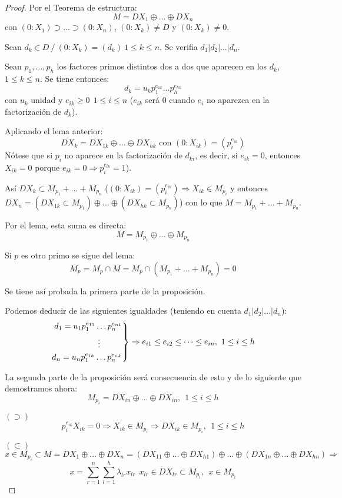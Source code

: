 \documentclass{article}
\newenvironment{rcases}
{\left.\begin{aligned}}
	{\end{aligned}\right\rbrace}
\theoremstyle{theorem-style}  %
\theoremstyle{definition}
\theoremstyle{example-style}
\begin{document}
	\begin{proof}
		Por el Teorema de estructura:
		\[M=DX_1\oplus\dots\oplus DX_n\]
		con $(0:X_1)\supset\dots\supset(0:X_n)$, $(0:X_k)\neq D$ y $(0:X_k)\neq 0$.

		Sean $d_k\in D \ / \ (0:X_k)=(d_k) \ 1\leq k\leq n$. Se verifia $d_1|d_2 | \dots | d_n$.

		Sean $p_1,\dots,p_h$ los factores primos distintos dos a dos que aparecen en los $d_k$, $1\leq k\leq n$. Se tiene entonces:
		\[d_k=u_kp_1^{e_{1k}}\dots p_h^{e_{hk}}\]
		con $u_k$ unidad y $e_{ik}\geq 0 \ \ 1\leq i\leq n$ ($e_{ik}$ será 0 cuando $e_i$ no aparezca en la factorización de $d_k$).

		Aplicando el lema anterior:
		\[DX_k=DX_{1k}\oplus\dots\oplus DX_{hk} \text{ con } (0:X_{ik})=(p^{e_{ik}}_i)\]
		Nótese que si $p_i$ no aparece en la factorización de $d_{ki}$, es decir, si $e_{ik}=0$, entonces $X_{ik}=0$ porque $e_{ik}=0\Rightarrow p^{e_{ik}}_i=1$).

		Así $DX_k\subset M_{p_1}+\dots+M_{p_n}$ ($(0:X_{ik})=(p^{e_{ik}}_i)\Rightarrow X_{ik}\in M_{p_i}$ y entonces $DX_n=(DX_{1k}\subset M_{p_1})\oplus\dots\oplus (DX_{hk}\subset M_{p_n})$) con lo que $M=M_{p_1}+\dots + M_{p_n}$.

		Por el lema, esta suma es directa:
		\[M=M_{p_1}\oplus\dots\oplus M_{p_n}\]

		Si $p$ es otro primo se sigue del lema:
		\[M_p=M_p\cap M=M_p \cap (M_{p_1}+\dots+M_{p_n})=0\]

		Se tiene así probada la primera parte de la proposición.

		Podemos deducir de las siguientes igualdades (teniendo en cuenta $d_1|d_2|\dots|d_n$):
		\[
		\begin{rcases}
			d_1=u_1p^{e_{11}}_1\dots p^{e_{n1}}_n\\
			\vdots \ \ \ \ \ \ \ \  \\
			d_n=u_np^{e_{1k}}_1\dots p^{e_{nk}}_n\\
		\end{rcases}
		\Rightarrow e_{i1}\leq e_{i2} \leq\dots\leq e_{in}, \ 1\leq i\leq h
		\]

		La segunda parte de la proposición será consecuencia de esto y de lo siguiente que demostramos ahora:
		\[M_{p_i}=DX_{in}\oplus\dots\oplus DX_{in},\ \ 1\leq i\leq h\]

		$(\supset)$
		\[p^{e_{ik}}_iX_{ik}=0\Rightarrow X_{ik}\in M_{p_i}\Rightarrow DX_{ik} \in M_{p_i},\ \ 1\leq i\leq h\]

		$(\subset)$
		\[x\in M_{p_i} \subset M = DX_1\oplus\dots\oplus DX_n=(DX_{11}\oplus\dots\oplus DX_{h1})\oplus\dots\oplus(DX_{1n}\oplus\dots\oplus DX_{hn}) \Rightarrow\]
		\[x=\sum_{r=1}^n\sum_{l=1}^h \lambda_{lr}x_{lr} \ \ x_{lr}\in DX_{lr}\subset M_{p_l},\ \ x\in M_{p_i}\]


\end{proof}
\end{document}
